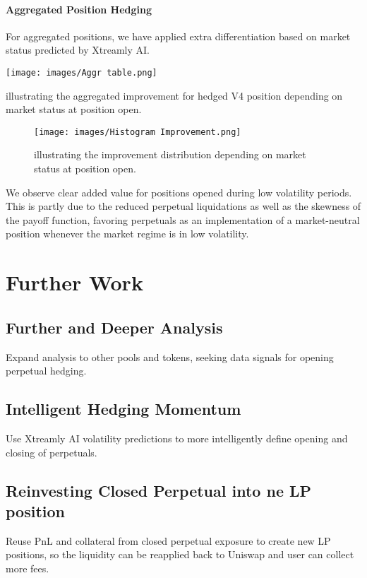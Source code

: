 \documentclass[12pt]{article}
\begin{document}
\paragraph{Aggregated Position Hedging}
For aggregated positions, we have applied extra differentiation based on market status predicted by Xtreamly AI.

\begin{table}[htb]
	\centering
	\texttt{[image: images/Aggr table.png]}
	\caption{illustrating the aggregated improvement for hedged V4 position depending on market status at position open.}
	\label{fig:Agr}
\end{table}

\begin{figure}[htb]
	\centering
	\texttt{[image: images/Histogram Improvement.png]}
	\caption{illustrating the improvement distribution depending on market status at position open.}
	\label{fig:HistImprov}
\end{figure}

We observe clear added value for positions opened during low volatility periods. This is partly due to the reduced perpetual liquidations as well as the skewness of the payoff function, favoring perpetuals as an implementation of a market-neutral position whenever the market regime is in low volatility.

\newpage

\section{Further Work}
\label{sec:futurework}

\subsection{Further and Deeper Analysis}
Expand analysis to other pools and tokens, seeking data signals for opening perpetual hedging.

\subsection{Intelligent Hedging Momentum}
Use Xtreamly AI volatility predictions to more intelligently define opening and closing of perpetuals.

\subsection{Reinvesting Closed Perpetual into ne LP position}
Reuse PnL and collateral from closed perpetual exposure to create new LP positions, so the liquidity can be reapplied back to Uniswap and user can collect more fees.
\end{document}
